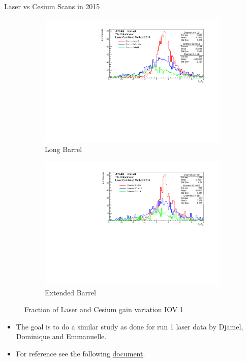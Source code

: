 \documentclass{beamer}
\begin{document}
\begin{frame}{Laser vs Cesium Scans in 2015}
\begin{figure}[H]
\centering
\begin{subfigure} [t] {0.49\textwidth}
\includegraphics[width=\textwidth]{ratio_lb_iov1.pdf}
\caption{Long Barrel}
\end{subfigure}
\begin{subfigure} [t] {0.49\textwidth}
\includegraphics[width=\textwidth]{ratio_eb_iov1.pdf}
\caption{Extended Barrel}
\end{subfigure}
\caption{Fraction of Laser and Cesium gain variation IOV 1}
\end{figure}
\begin{itemize}
    \item The goal is to do a similar study as done for run 1 laser data by Djamel, Dominique and Emmanuelle.
    \item For reference see the following \href{https://cds.cern.ch/record/1647990/files/ATL-TILECAL-INT-2014-002.pdf}{document}.
\end{itemize}
\end{frame}
\end{document}

